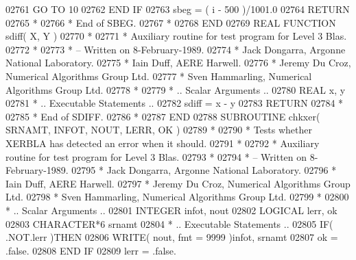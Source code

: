 \begin{DoxyCode}
02761          \textcolor{keywordflow}{GO TO} 10
02762 \textcolor{keywordflow}{      END IF}
02763       sbeg = ( i - 500 )/1001.0
02764       \textcolor{keywordflow}{RETURN}
02765 \textcolor{comment}{*}
02766 \textcolor{comment}{*     End of SBEG.}
02767 \textcolor{comment}{*}
02768 \textcolor{keyword}{      END}
02769 \textcolor{keyword}{      REAL }\textcolor{keyword}{FUNCTION }sdiff( X, Y )
02770 \textcolor{comment}{*}
02771 \textcolor{comment}{*  Auxiliary routine for test program for Level 3 Blas.}
02772 \textcolor{comment}{*}
02773 \textcolor{comment}{*  -- Written on 8-February-1989.}
02774 \textcolor{comment}{*     Jack Dongarra, Argonne National Laboratory.}
02775 \textcolor{comment}{*     Iain Duff, AERE Harwell.}
02776 \textcolor{comment}{*     Jeremy Du Croz, Numerical Algorithms Group Ltd.}
02777 \textcolor{comment}{*     Sven Hammarling, Numerical Algorithms Group Ltd.}
02778 \textcolor{comment}{*}
02779 \textcolor{comment}{*     .. Scalar Arguments ..}
02780       \textcolor{keywordtype}{REAL}               x, y
02781 \textcolor{comment}{*     .. Executable Statements ..}
02782       sdiff = x - y
02783       \textcolor{keywordflow}{RETURN}
02784 \textcolor{comment}{*}
02785 \textcolor{comment}{*     End of SDIFF.}
02786 \textcolor{comment}{*}
02787 \textcolor{keyword}{      END}
02788 \textcolor{keyword}{      SUBROUTINE }chkxer( SRNAMT, INFOT, NOUT, LERR, OK )
02789 \textcolor{comment}{*}
02790 \textcolor{comment}{*  Tests whether XERBLA has detected an error when it should.}
02791 \textcolor{comment}{*}
02792 \textcolor{comment}{*  Auxiliary routine for test program for Level 3 Blas.}
02793 \textcolor{comment}{*}
02794 \textcolor{comment}{*  -- Written on 8-February-1989.}
02795 \textcolor{comment}{*     Jack Dongarra, Argonne National Laboratory.}
02796 \textcolor{comment}{*     Iain Duff, AERE Harwell.}
02797 \textcolor{comment}{*     Jeremy Du Croz, Numerical Algorithms Group Ltd.}
02798 \textcolor{comment}{*     Sven Hammarling, Numerical Algorithms Group Ltd.}
02799 \textcolor{comment}{*}
02800 \textcolor{comment}{*     .. Scalar Arguments ..}
02801       \textcolor{keywordtype}{INTEGER}            infot, nout
02802       \textcolor{keywordtype}{LOGICAL}            lerr, ok
02803       \textcolor{keywordtype}{CHARACTER*6}        srnamt
02804 \textcolor{comment}{*     .. Executable Statements ..}
02805       \textcolor{keywordflow}{IF}( .NOT.lerr )\textcolor{keywordflow}{THEN}
02806          \textcolor{keyword}{WRITE}( nout, fmt = 9999 )infot, srnamt
02807          ok = .false.
02808 \textcolor{keywordflow}{      END IF}
02809       lerr = .false.

\end{DoxyCode}
